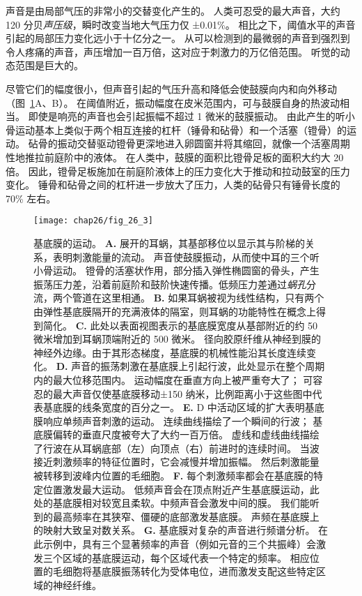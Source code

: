 声音是由局部气压的非常小的交替变化产生的。
人类可忍受的最大声音，大约 120 分贝\textit{声压级}，瞬时改变当地大气压力仅 ±0.01\%。
相比之下，阈值水平的声音引起的局部压力变化远小于十亿分之一。
从可以检测到的最微弱的声音到强烈到令人疼痛的声音，声压增加一百万倍，这对应于刺激力的万亿倍范围。
听觉的动态范围是巨大的。


尽管它们的幅度很小，但声音引起的气压升高和降低会使鼓膜向内和向外移动（图~\ref{fig:26_3}A、B）。
在阈值附近，振动幅度在皮米范围内，可与鼓膜自身的热波动相当。
即使是响亮的声音也会引起振幅不超过 1 微米的鼓膜振动。
由此产生的听小骨运动基本上类似于两个相互连接的杠杆（锤骨和砧骨）和一个活塞（镫骨）的运动。
砧骨的振动交替驱动镫骨更深地进入卵圆窗并将其缩回，就像一个活塞周期性地推拉前庭阶中的液体。
在人类中，鼓膜的面积比镫骨足板的面积大约大 20 倍。
因此，镫骨足板施加在前庭阶液体上的压力变化大于推动和拉动鼓室的压力变化。
锤骨和砧骨之间的杠杆进一步放大了压力，人类的砧骨只有锤骨长度的 70\% 左右。


\begin{figure}[htbp]
	\centering
	\texttt{[image: chap26/fig\_26\_3]}
	\caption{基底膜的运动。
		\textbf{A.} 展开的耳蜗，其基部移位以显示其与阶梯的关系，表明刺激能量的流动。
		声音使鼓膜振动，从而使中耳的三个听小骨运动。
		镫骨的活塞状作用，部分插入弹性椭圆窗的骨头，产生振荡压力差，沿着前庭阶和鼓阶快速传播。低频压力差通过\textit{蜗孔}分流，两个管道在这里相通。
		\textbf{B.} 如果耳蜗被视为线性结构，只有两个由弹性基底膜隔开的充满液体的隔室，则耳蜗的功能特性在概念上得到简化。
		\textbf{C.} 此处以表面视图表示的基底膜宽度从基部附近的约 50 微米增加到耳蜗顶端附近的 500 微米。
		径向胶原纤维从神经到膜的神经外边缘。由于其形态梯度，基底膜的机械性能沿其长度连续变化。
		\textbf{D.} 声音的振荡刺激在基底膜上引起行波，此处显示在整个周期内的最大位移范围内。
		运动幅度在垂直方向上被严重夸大了；
		可容忍的最大声音仅使基底膜移动±150 纳米，比例距离小于这些图中代表基底膜的线条宽度的百分之一。
		\textbf{E.} D 中活动区域的扩大表明基底膜响应单频声音刺激的运动。
		连续曲线描绘了一个瞬间的行波；
		基底膜偏转的垂直尺度被夸大了大约一百万倍。
		虚线和虚线曲线描绘了行波在从耳蜗底部（左）向顶点（右）前进时的连续时间。
		当波接近刺激频率的特征位置时，它会减慢并增加振幅。
		然后刺激能量被转移到波峰内位置的毛细胞。
		\textbf{F.} 每个刺激频率都会在基底膜的特定位置激发最大运动。
		低频声音会在顶点附近产生基底膜运动，此处的基底膜相对较宽且柔软。中频声音会激发中间的膜。
		我们能听到的最高频率在其狭窄、僵硬的底部激发基底膜。
		声频在基底膜上的映射大致呈对数关系。
		\textbf{G.} 基底膜对复杂的声音进行频谱分析。
		在此示例中，具有三个显著频率的声音（例如元音的三个共振峰）会激发三个区域的基底膜运动，每个区域代表一个特定的频率。
		相应位置的毛细胞将基底膜振荡转化为受体电位，进而激发支配这些特定区域的神经纤维。}
	\label{fig:26_3}
\end{figure}


